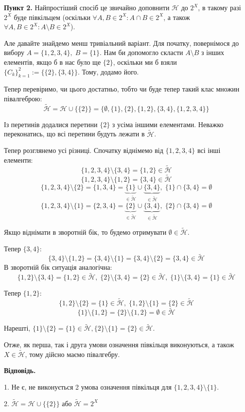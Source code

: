 \documentclass[12pt]{extarticle}
\begin{document}
\textbf{Пункт 2.} Найпростіший спосіб це звичайно доповнити $\mathcal{H}$ до $2^X$, в такому разі $2^X$ буде півкільцем (оскільки $\forall A,B \in 2^X: A \cap B \in 2^X$, а також $\forall A,B \in 2^X: A \setminus B \in 2^X$).

Але давайте знайдемо менш тривіальний варіант. Для початку, повернімося до вибору $A = \{1,2,3,4\}, \; B = \{1\}$. Нам би допомогло скласти $A \setminus B$ з інших елементів, якщо б в нас було ще $\{2\}$, оскільки ми б взяли $\{C_k\}_{k=1}^2 := \{\{2\}, \{3,4\}\}$. Тому, додамо його.

Тепер перевіримо, чи цього достатньо, тобто чи буде тепер такий клас множин півалгеброю:
\[
\widetilde{\mathcal{H}} = \mathcal{H} \cup \{\{2\}\}= \{\emptyset, \{1\}, \{2\}, \{1,2\}, \{3,4\}, \{1,2,3,4\}\}
\]

Із перетинів додалися перетини $\{2\}$ з усіма іншими елементами. Неважко переконатись, що всі перетини будуть лежати в $\widetilde{\mathcal{H}}$.

Тепер розглянемо усі різниці. Спочатку віднімемо від $\{1,2,3,4\}$ всі інші елементи:
\[
\{1,2,3,4\} \setminus \{3,4\} = \{1,2\} \in \widetilde{\mathcal{H}}
\]
\[
\{1,2,3,4\} \setminus \{1,2\} = \{3,4\} \in \widetilde{\mathcal{H}}
\]
\[
\{1,2,3,4\} \setminus \{2\} = \{1,3,4\} = \underbrace{\{1\}}_{\in \widetilde{\mathcal{H}}} \cup \underbrace{\{3,4\}}_{\in \widetilde{\mathcal{H}}}, \; \{1\} \cap \{3,4\} = \emptyset
\]
\[
\{1,2,3,4\} \setminus \{1\} = \{2,3,4\} = \underbrace{\{2\}}_{\in \widetilde{\mathcal{H}}} \cup \underbrace{\{3,4\}}_{\in \widetilde{\mathcal{H}}}, \; \{2\} \cap \{3,4\} = \emptyset
\]

Якщо віднімати в зворотній бік, то будемо отримувати $\emptyset \in \widetilde{\mathcal{H}}$. 

Тепер $\{3,4\}$:
\[
\{3,4\} \setminus \{1,2\} = \{3,4\} \setminus \{1\} = \{3,4\} \setminus \{2\} = \{3,4\} \in \widetilde{\mathcal{H}}
\]
В зворотній бік ситуація аналогічна:
\[
\{1,2\} \setminus \{3,4\} = \{1,2\} \in \widetilde{\mathcal{H}}, \; \{2\} \setminus \{3,4\} = \{2\} \in \widetilde{\mathcal{H}}, \; \{1\} \setminus \{3,4\} = \{1\} \in \widetilde{\mathcal{H}}
\]

Тепер $\{1,2\}$:
\[
\{1,2\} \setminus \{2\} = \{1\} \in \widetilde{\mathcal{H}}, \; \{1,2\} \setminus \{1\} = \{2\} \in \widetilde{\mathcal{H}}
\]
\[
\{1\} \setminus \{1,2\} = \{2\} \setminus \{1,2\} = \emptyset \in \widetilde{\mathcal{H}}
\]

Нарешті, $\{1\} \setminus \{2\} = \{1\} \in \widetilde{\mathcal{H}}, \{2\} \setminus \{1\} = \{2\} \in \widetilde{\mathcal{H}}$. 

Отже, як перша, так і друга умови означення півкільця виконуються, а також $X \in \widetilde{\mathcal{H}}$, тому дійсно маємо півалгебру. 

\textbf{Відповідь.} 

1. Не є, не виконується 2 умова означення півкільця для $\{1,2,3,4\} \setminus \{1\}$.

2. $\widetilde{\mathcal{H}} = \mathcal{H} \cup \{\{2\}\}$ або $\widetilde{\mathcal{H}} = 2^X$
\end{document}
